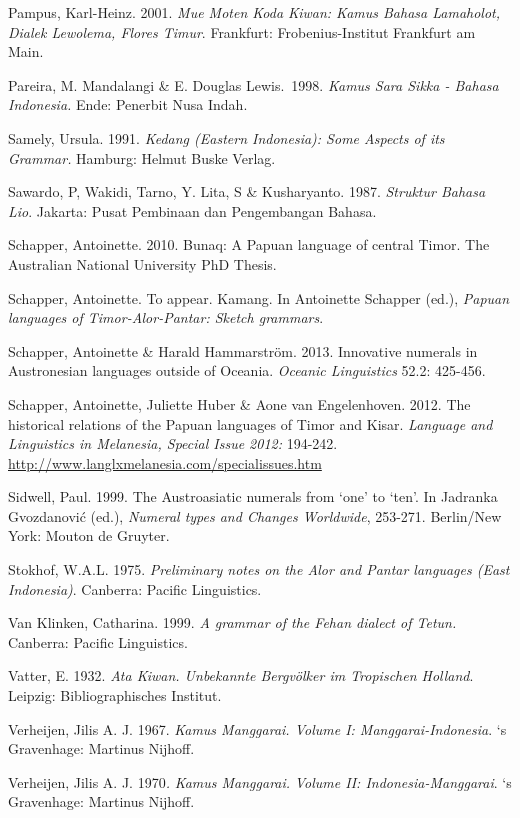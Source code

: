 Pampus, Karl-Heinz. 2001. \textit{Mue Moten Koda Kiwan: Kamus Bahasa Lamaholot, Dialek Lewolema, Flores Timur}. Frankfurt: Frobenius-Institut Frankfurt am Main.

Pareira, M. Mandalangi \& E. Douglas Lewis.~1998. \textit{Kamus Sara Sikka - Bahasa Indonesia.} Ende: Penerbit Nusa Indah. 

Samely, Ursula. 1991. \textit{Kedang (Eastern Indonesia): Some Aspects of its Grammar.} Hamburg: Helmut Buske Verlag.

Sawardo, P, Wakidi, Tarno, Y. Lita, S \& Kusharyanto. 1987. \textit{Struktur Bahasa Lio}. Jakarta: Pusat Pembinaan dan Pengembangan Bahasa.

Schapper, Antoinette. 2010. Bunaq: A Papuan language of central Timor.\textit{ }The Australian National University PhD Thesis.

Schapper, Antoinette. To appear. Kamang. In Antoinette Schapper (ed.), \textit{Papuan languages of Timor-Alor-Pantar: Sketch grammars}.

Schapper, Antoinette \& Harald Hammarstr\"om. 2013. Innovative numerals in Austronesian languages outside of Oceania. \textit{Oceanic Linguistics} 52.2: 425-456.

Schapper, Antoinette, Juliette Huber \& Aone van Engelenhoven. 2012. The historical relations of the Papuan languages of Timor and Kisar. \textit{Language and Linguistics in Melanesia, Special Issue 2012: }194-242. \url{http://www.langlxmelanesia.com/specialissues.htm}

Sidwell, Paul. 1999. The Austroasiatic numerals from {\textquoteleft}one{\textquoteright} to {\textquoteleft}ten{\textquoteright}. In Jadranka Gvozdanovi\'c (ed.), \textit{Numeral types and Changes Worldwide}, 253-271. Berlin/New York: Mouton de Gruyter.

Stokhof, W.A.L. 1975. \textit{Preliminary notes on the Alor and Pantar languages (East Indonesia)}. Canberra: Pacific Linguistics.

Van Klinken, Catharina. 1999. \textit{A grammar of the Fehan dialect of Tetun.} Canberra: Pacific Linguistics.

Vatter, E. 1932. \textit{Ata Kiwan. Unbekannte Bergv\"olker im Tropischen Holland}. Leipzig: Bibliographisches Institut.

Verheijen, Jilis A. J. 1967. \textit{Kamus Manggarai. Volume I: Manggarai-Indonesia}. {\textquoteleft}s Gravenhage: Martinus Nijhoff. 

Verheijen, Jilis A. J. 1970\textit{. }\textit{Kamus Manggarai. }\textit{Volume II: Indonesia-Manggarai}. {\textquoteleft}s Gravenhage: Martinus Nijhoff.

